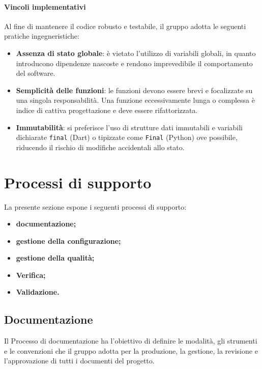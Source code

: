 \documentclass[a4paper,12pt]{article}
\begin{document}
\paragraph{Vincoli implementativi}
Al fine di mantenere il codice robusto e testabile, il gruppo adotta le seguenti pratiche ingegneristiche:
\begin{itemize}
    \item \textbf{Assenza di stato globale}: è vietato l'utilizzo di variabili globali, in quanto introducono dipendenze nascoste e rendono imprevedibile il comportamento del software.
    \item \textbf{Semplicità delle funzioni}: le funzioni devono essere brevi e focalizzate su una singola responsabilità. Una funzione eccessivamente lunga o complessa è indice di cattiva progettazione e deve essere rifattorizzata.
    \item \textbf{Immutabilità}: si preferisce l'uso di strutture dati immutabili e variabili dichiarate \texttt{final} (Dart) o tipizzate come \texttt{Final} (Python) ove possibile, riducendo il rischio di modifiche accidentali allo stato.
\end{itemize}

\section{Processi di supporto}
La presente sezione espone i seguenti processi di supporto:
\begin{itemize}
    \item[(a)] \textbf{documentazione;}
    \item[(b)] \textbf{gestione della configurazione;}
    \item[(c)] \textbf{gestione della qualità;}
    \item[(d)] \textbf{Verifica;}
    \item[(e)] \textbf{Validazione.}
\end{itemize}

\subsection{Documentazione} \label{sec:documentazione}
Il Processo di documentazione ha l’obiettivo di definire le modalità, gli strumenti e le convenzioni che il gruppo adotta per la produzione, la gestione, la revisione e l’approvazione di tutti i documenti del progetto.
\end{document}

